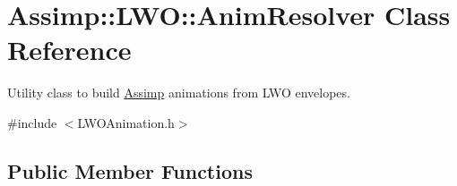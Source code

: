 \hypertarget{class_assimp_1_1_l_w_o_1_1_anim_resolver}{\section{Assimp\+:\+:L\+W\+O\+:\+:Anim\+Resolver Class Reference}
\label{class_assimp_1_1_l_w_o_1_1_anim_resolver}
}


Utility class to build \hyperlink{class_assimp}{Assimp} animations from L\+W\+O envelopes.  




{\ttfamily \#include $<$L\+W\+O\+Animation.\+h$>$}

\subsection*{Public Member Functions}
